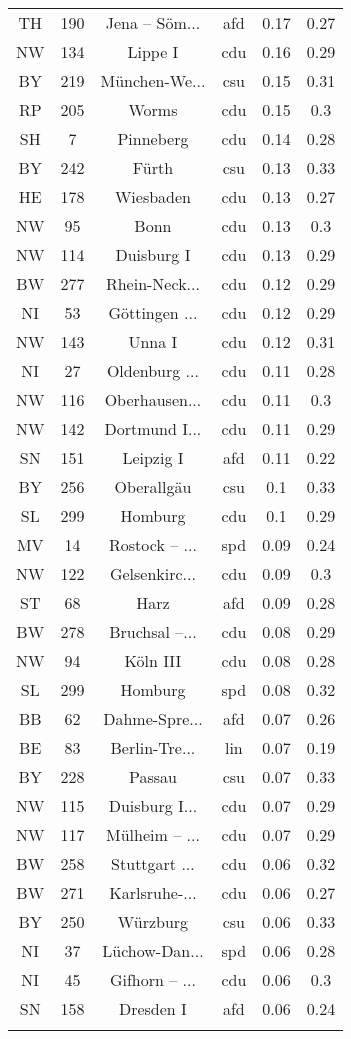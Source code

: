 \begin{table}[!htbp]
\begin{tabular}{@{\extracolsep{5pt}} cccccc}
TH & 190 & Jena – Söm... & afd & 0.17 & 0.27 \\ 
NW & 134 & Lippe I & cdu & 0.16 & 0.29 \\ 
BY & 219 & München-We... & csu & 0.15 & 0.31 \\ 
RP & 205 & Worms & cdu & 0.15 & 0.3 \\ 
SH & 7 & Pinneberg & cdu & 0.14 & 0.28 \\ 
BY & 242 & Fürth & csu & 0.13 & 0.33 \\ 
HE & 178 & Wiesbaden & cdu & 0.13 & 0.27 \\ 
NW & 95 & Bonn & cdu & 0.13 & 0.3 \\ 
NW & 114 & Duisburg I & cdu & 0.13 & 0.29 \\ 
BW & 277 & Rhein-Neck... & cdu & 0.12 & 0.29 \\ 
NI & 53 & Göttingen ... & cdu & 0.12 & 0.29 \\ 
NW & 143 & Unna I & cdu & 0.12 & 0.31 \\ 
NI & 27 & Oldenburg ... & cdu & 0.11 & 0.28 \\ 
NW & 116 & Oberhausen... & cdu & 0.11 & 0.3 \\ 
NW & 142 & Dortmund I... & cdu & 0.11 & 0.29 \\ 
SN & 151 & Leipzig I & afd & 0.11 & 0.22 \\ 
BY & 256 & Oberallgäu & csu & 0.1 & 0.33 \\ 
SL & 299 & Homburg & cdu & 0.1 & 0.29 \\ 
MV & 14 & Rostock – ... & spd & 0.09 & 0.24 \\ 
NW & 122 & Gelsenkirc... & cdu & 0.09 & 0.3 \\ 
ST & 68 & Harz & afd & 0.09 & 0.28 \\ 
BW & 278 & Bruchsal –... & cdu & 0.08 & 0.29 \\ 
NW & 94 & Köln III & cdu & 0.08 & 0.28 \\ 
SL & 299 & Homburg & spd & 0.08 & 0.32 \\ 
BB & 62 & Dahme-Spre... & afd & 0.07 & 0.26 \\ 
BE & 83 & Berlin-Tre... & lin & 0.07 & 0.19 \\ 
BY & 228 & Passau & csu & 0.07 & 0.33 \\ 
NW & 115 & Duisburg I... & cdu & 0.07 & 0.29 \\ 
NW & 117 & Mülheim – ... & cdu & 0.07 & 0.29 \\ 
BW & 258 & Stuttgart ... & cdu & 0.06 & 0.32 \\ 
BW & 271 & Karlsruhe-... & cdu & 0.06 & 0.27 \\ 
BY & 250 & Würzburg & csu & 0.06 & 0.33 \\ 
NI & 37 & Lüchow-Dan... & spd & 0.06 & 0.28 \\ 
NI & 45 & Gifhorn – ... & cdu & 0.06 & 0.3 \\ 
SN & 158 & Dresden I & afd & 0.06 & 0.24 \\ 
\hline \\[-1.8ex] 
\end{tabular} 
\end{table} 
